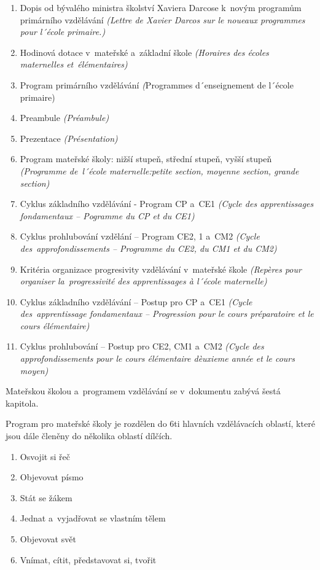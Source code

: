 	\begin{enumerate}[1]
		\setlength\itemsep{-2mm}
		\item Dopis od bývalého ministra školství Xaviera Darcose k novým programům primárního vzdělávání \textit{(Lettre de Xavier Darcos sur le noueaux programmes pour l´école primaire.)}
		\item Hodinová dotace v mateřské a~základní škole \textit{(Horaires des écoles maternelles et élémentaires)}
		\item Program primárního vzdělávání \textit({Programmes d´enseignement  de l´école primaire)}
		\item Preambule \textit{(Préambule)}
		\item Prezentace \textit{(Présentation)}
		\item Program mateřské školy: nižší stupeň, střední stupeň, vyšší stupeň \textit{(Programme de l´école maternelle:petite section, moyenne section, grande section)}
		\item Cyklus základního vzdělávání - Program CP a~CE1 \textit{(Cycle des apprentissages fondamentaux – Pogramme du CP et du CE1)}
		\item Cyklus prohlubování vzdělání – Program CE2, 1 a~CM2 \textit{(Cycle des approfondissements – Programme du CE2, du CM1 et du CM2)}
		\item Kritéria organizace progresivity vzdělávání v mateřské škole \textit{(Repères pour organiser la progressivité des apprentissages à l´école maternelle)}
		\item Cyklus základního vzdělávání – Postup pro CP a~CE1 \textit{(Cycle des apprentissage fondamentaux – Progression pour le cours préparatoire et le cours élémentaire)}
		\item Cyklus prohlubování – Postup pro CE2, CM1 a~CM2 \textit{(Cycle des approfondissements pour le cours élémentaire dèuxieme année et le cours moyen)}
	\end{enumerate}


	Mateřskou školou a~programem vzdělávání se v~dokumentu zabývá šestá kapitola.

	Program pro mateřské školy je rozdělen do 6ti hlavních vzdělávacích oblastí, které jsou dále členěny do několika oblastí dílčích.
	
	\begin{enumerate}[1]
		\setlength\itemsep{-2mm}
		\item Osvojit si řeč 
		\item Objevovat písmo 
		\item Stát se žákem 
		\item Jednat a~vyjadřovat se vlastním tělem 
		\item Objevovat svět
		\item Vnímat, cítit, představovat si, tvořit
	\end{enumerate}

